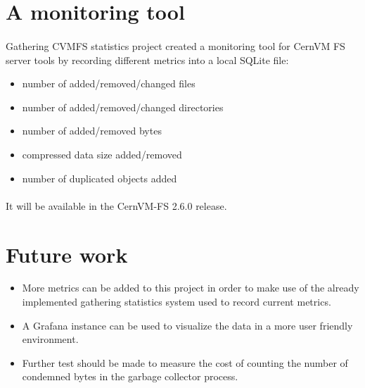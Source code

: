 \section{A monitoring tool}

\paragraph{}
Gathering CVMFS statistics project created a monitoring tool for CernVM FS server tools by recording different metrics into a local SQLite file:
\begin{itemize}
  \item number of added/removed/changed files
  \item number of added/removed/changed directories
  \item number of added/removed bytes
  \item compressed data size added/removed
  \item number of duplicated objects added
\end{itemize}

\paragraph{}
It will be available in the CernVM-FS 2.6.0 release. 
\paragraph{}
\section{Future work}

\begin{itemize}
\item More metrics can be added to this project in order to make use of the already implemented gathering statistics system used to record current metrics.
\item A Grafana instance can be used to visualize the data in a more user friendly environment.
\item Further test should be made to measure the cost of counting the number of condemned bytes in the garbage collector process.
\end{itemize}